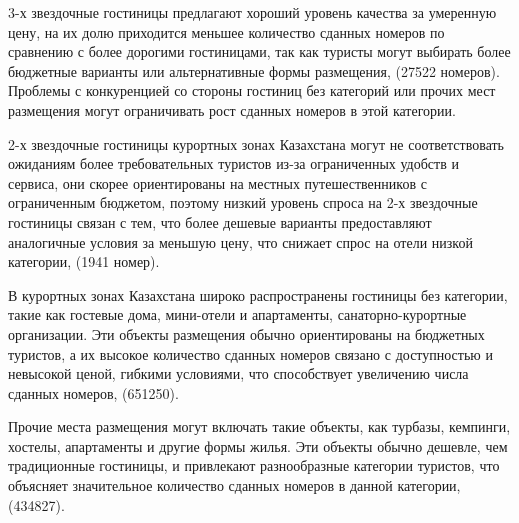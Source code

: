 \begin{multicols}{2}
3-х звездочные гостиницы предлагают хороший уровень качества за
умеренную цену, на их долю приходится меньшее количество сданных номеров
по сравнению с более дорогими гостиницами, так как туристы могут
выбирать более бюджетные варианты или альтернативные формы размещения,
(27522 номеров). Проблемы с конкуренцией со стороны гостиниц без
категорий или прочих мест размещения могут ограничивать рост сданных
номеров в этой категории.

2-х звездочные гостиницы курортных зонах Казахстана могут не
соответствовать ожиданиям более требовательных туристов из-за
ограниченных удобств и сервиса, они скорее ориентированы на местных
путешественников с ограниченным бюджетом, поэтому низкий уровень спроса
на 2-х звездочные гостиницы связан с тем, что более дешевые варианты
предоставляют аналогичные условия за меньшую цену, что снижает спрос на
отели низкой категории, (1941 номер).

В курортных зонах Казахстана широко распространены гостиницы без
категории, такие как гостевые дома, мини-отели и апартаменты,
санаторно-курортные организации. Эти объекты размещения обычно
ориентированы на бюджетных туристов, а их высокое количество сданных
номеров связано с доступностью и невысокой ценой, гибкими условиями, что
способствует увеличению числа сданных номеров, (651250).

Прочие места размещения могут включать такие объекты, как турбазы,
кемпинги, хостелы, апартаменты и другие формы жилья. Эти объекты обычно
дешевле, чем традиционные гостиницы, и привлекают разнообразные
категории туристов, что объясняет значительное количество сданных
номеров в данной категории, (434827).
\end{multicols}

